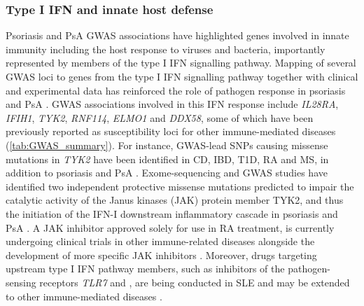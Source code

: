 \subsubsection*{Type I IFN and innate host defense}
Psoriasis and PsA GWAS associations have highlighted genes involved in innate immunity including the host response to viruses and bacteria, importantly represented by members of the type I IFN signalling pathway. Mapping of several GWAS loci to genes from the type I IFN signalling pathway together with clinical and experimental data has reinforced the role of pathogen response in psoriasis and PsA \parencite{Nestle2005}. GWAS associations involved in this IFN response include \textit{IL28RA}, \textit{IFIH1}, \textit{TYK2}, \textit{RNF114}, \textit{ELMO1} and \textit{DDX58}, some of which have been previously reported as susceptibility loci for other immune-mediated diseases (\ref{tab:GWAS_summary}). For instance, GWAS-lead SNPs causing missense mutations in \textit{TYK2} have been identified in CD, IBD, T1D, RA and MS, in addition to psoriasis and PsA \parencite{ImmunoBase}. %
Exome-sequencing and GWAS studies have identified two independent protective missense mutations predicted to impair the catalytic activity of the Janus kinases (JAK) protein member TYK2, and thus the initiation of the IFN-I downstream inflammatory cascade in psoriasis and PsA \parencite{Strange2010, Tsoi2012, Dand2017}. A JAK inhibitor approved solely for use in RA treatment, is currently undergoing clinical trials in other immune-related diseases alongside the development of more specific JAK inhibitors \parencite{Baker2017}. Moreover, drugs targeting upstream type I IFN pathway members, such as inhibitors of the pathogen-sensing receptors \textit{TLR7} and \parencite{TLR9}, are being conducted in SLE and may be extended to other immune-mediated diseases \parencite{Baker2017}. 

